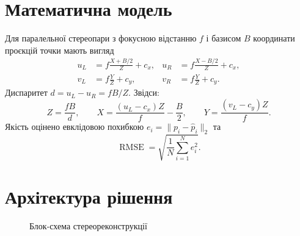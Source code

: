\documentclass[12pt,a4paper]{article}
\begin{document}
\section{Математична модель}
Для паралельної стереопари з фокусною відстанню $f$ і базисом $B$ координати проєкцій точки мають вигляд
\begin{align}
u_L&=f\frac{X+B/2}{Z}+c_x,&u_R&=f\frac{X-B/2}{Z}+c_x,\\
v_L&=f\frac{Y}{Z}+c_y,&v_R&=f\frac{Y}{Z}+c_y.
\end{align}
Диспаритет $d=u_L-u_R=fB/Z$. Звідси:
\begin{equation}Z=\frac{fB}{d},\qquad X=\frac{(u_L-c_x)Z}{f}-\frac B2,\qquad Y=\frac{(v_L-c_y)Z}{f}.\end{equation}
Якість оцінено евклідовою похибкою $e_i=\lVert p_i-\hat p_i\rVert_2$ та
\begin{equation}\operatorname{RMSE}=\sqrt{\frac1N\sum_{i=1}^{N}e_i^2}.\end{equation}

\section{Архітектура рішення}
\begin{figure}[H]\centering
{}\caption{Блок-схема стереореконструкції}
\end{figure}
\end{document}
